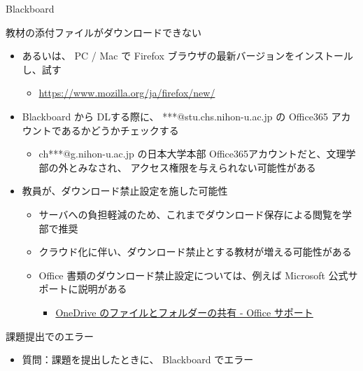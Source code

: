 \documentclass[a4j,10pt]{jsarticle}
\begin{document}
{\begin{frame}[label={sec:org166405d},fragile]{Blackboard}
\begin{block}{教材の添付ファイルがダウンロードできない}
\begin{itemize}
\begin{itemize}
\item \url{https://www.google.com/intl/ja\_jp/chrome/}
\item Web ブラウザを変更するだけで解決することも多い
\end{itemize}
\par
\item あるいは、 PC / Mac で Firefox ブラウザの最新バージョンをインストールし、試す
\begin{itemize}
\item \url{https://www.mozilla.org/ja/firefox/new/}
\end{itemize}
\par
\item Blackboard から DLする際に、 ***@stu.chs.nihon-u.ac.jp の Office365 アカウントであるかどうかチェックする
\begin{itemize}
\item ch***@g.nihon-u.ac.jp の日本大学本部 Office365アカウントだと、文理学部の外とみなされ、
アクセス権限を与えられない可能性がある
\end{itemize}
\par
\item 教員が、ダウンロード禁止設定を施した可能性
\begin{itemize}
\item サーバへの負担軽減のため、これまでダウンロード保存による閲覧を学部で推奨
\item クラウド化に伴い、ダウンロード禁止とする教材が増える可能性がある
\item Office 書類のダウンロード禁止設定については、例えば Microsoft 公式サポートに説明がある
\begin{itemize}
\item \href{https://support.microsoft.com/ja-jp/office/onedrive-\%E3\%81\%AE\%E3\%83\%95\%E3\%82\%A1\%E3\%82\%A4\%E3\%83\%AB\%E3\%81\%A8\%E3\%83\%95\%E3\%82\%A9\%E3\%83\%AB\%E3\%83\%80\%E3\%83\%BC\%E3\%81\%AE\%E5\%85\%B1\%E6\%9C\%89-9fcc2f7d-de0c-4cec-93b0-a82024800c07}{OneDrive のファイルとフォルダーの共有 - Office サポート}
\end{itemize}
\end{itemize}
\end{itemize}
\end{block}
\par
\begin{block}{課題提出でのエラー}
\begin{itemize}
\item 質問：課題を提出したときに、 Blackboard でエラー

\end{itemize}
\end{block}
\end{frame}}
\end{document}
